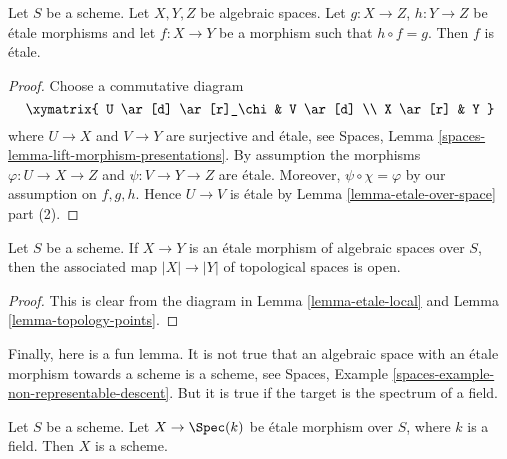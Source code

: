 \begin{lemma}
\label{lemma-etale-permanence}
Let $S$ be a scheme. Let $X, Y, Z$ be algebraic spaces.
Let $g : X \to Z$, $h : Y \to Z$ be \'etale morphisms and let
$f : X \to Y$ be a morphism such that $h \circ f = g$.
Then $f$ is \'etale.
\end{lemma}

\begin{proof}
Choose a commutative diagram
$$
\xymatrix{
U \ar[d] \ar[r]_\chi & V \ar[d] \\
X \ar[r] & Y
}
$$
where $U \to X$ and $V \to Y$ are surjective and \'etale, see
Spaces, Lemma \ref{spaces-lemma-lift-morphism-presentations}.
By assumption the morphisms $\varphi : U \to X \to Z$ and
$\psi : V \to Y \to Z$ are \'etale. Moreover, $\psi \circ \chi = \varphi$
by our assumption on $f, g, h$.
Hence $U \to V$ is \'etale by Lemma \ref{lemma-etale-over-space}
part (2).
\end{proof}

\begin{lemma}
\label{lemma-etale-open}
Let $S$ be a scheme.
If $X \to Y$ is an \'etale morphism of algebraic spaces over $S$,
then the associated map $|X| \to |Y|$ of topological spaces
is open.
\end{lemma}

\begin{proof}
This is clear from the diagram in
Lemma \ref{lemma-etale-local}
and
Lemma \ref{lemma-topology-points}.
\end{proof}

\noindent
Finally, here is a fun lemma. It is not true that an algebraic space
with an \'etale morphism towards a scheme is a scheme, see
Spaces, Example \ref{spaces-example-non-representable-descent}.
But it is true if the target is the spectrum of a field.

\begin{lemma}
\label{lemma-etale-over-field-scheme}
Let $S$ be a scheme. Let $X \to \Spec(k)$
be \'etale morphism over $S$, where $k$ is a field.
Then $X$ is a scheme.
\end{lemma}

